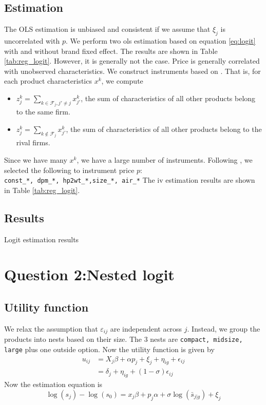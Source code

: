 \documentclass[12pt]{article}
\begin{document}
\subsection{Estimation}
The OLS estimation is unbiased and consistent if we assume that $\xi_j$ is
uncorrelated with $p$. We perform two ols estimation based on equation
\ref{eq:logit} with and without brand fixed effect. The results are shown in
Table \ref{tab:reg_logit}. However, it is generally not the case. Price is
generally correlated with unobserved characteristics. We construct instruments
based on \citep{blp1995}. That is, for each product characteristics $x^k$, we
compute
\begin{itemize}
    \item $z^k_{j}=\sum_{k\in \mathcal{F}_j, j'\neq j}x^k_{j'}$, the sum of characteristics of all other products belong to the same firm.
    \item $z^k_{j}=\sum_{k\notin \mathcal{F}_j}x^k_{j'}$, the sum of characteristics of all other products belong to the rival firms.
\end{itemize}
Since we have many $x^k$, we have a large number of instruments. Following \citep{blp1995}, we selected the following to instrument price $p$:\\
\verb|const_*, dpm_*, hp2wt_*,size_*, air_*|
The iv estimation results are shown in Table \ref{tab:reg_logit}.
\subsection{Results}
\begin{table}[h!]\fontsize{10pt}{12pt}\selectfont
    \centering
    
    \caption{Logit estimation results}
    \label{tab:reg_logit}
\end{table}

\section{Question 2:Nested logit}
\subsection{Utility function}
We relax the assumption that $\varepsilon_{ij}$ are independent across $j$.
Instead, we group the products into nests based on their size. The 3 nests are
\verb|compact, midsize, large| plus one outside option. Now the utility
function is given by
\begin{equation}
    \begin{split}
        u_{ij}&=X_{j}\beta + \alpha p_{j} + \xi_{j}+ \eta_{ig}+ \epsilon_{ij}\\
        &=\delta_j+\eta_{ig}+(1-\sigma)\epsilon_{ij}
    \end{split}
\end{equation}
Now the estimation equation is
\begin{equation}
    \log(s_j)-\log(s_0)=x_j\beta+p_j\alpha+\sigma\log(\bar{s}_{j|g})+\xi_j
\end{equation}
\end{document}
